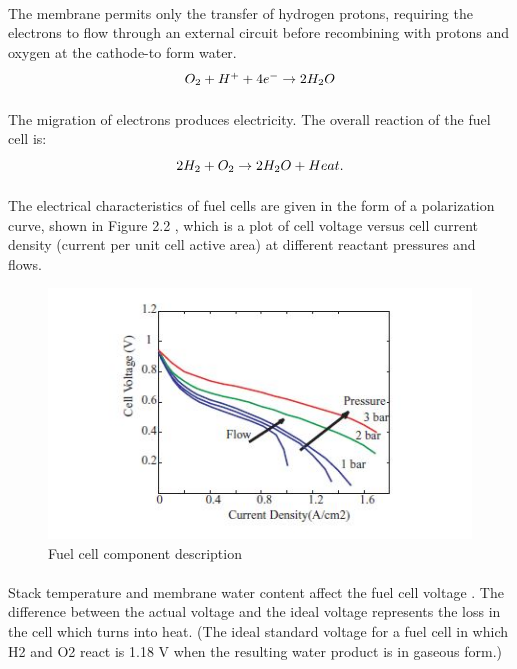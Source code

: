 \paragraph{}The membrane permits only the transfer of  hydrogen protons, requiring the electrons to flow through an external circuit before recombining with protons and oxygen at the cathode-to form water.
\begin{equation}
$$O_{2}+H^{+} + 4e^{-}\rightarrow 2H_{2}O $$
\end{equation}
\paragraph{}The migration of electrons produces electricity. The overall reaction of the fuel cell is:
\begin{equation}
$$2H_{2}+ O_{2} \rightarrow 2H_{2}O+Heat.$$
\end{equation}
\paragraph{}The electrical characteristics of fuel cells are given in the form of a polarization curve, shown in Figure 2.2 , which is a plot of cell voltage versus cell current density (current per unit cell active area) at different reactant pressures and flows.
\begin{figure}[!h]
\includegraphics{Figures/Figure6}
\caption{Fuel cell component description
\cite{stefanopoulou_mechatronics_nodate}}
\end{figure}
\paragraph{}Stack temperature and membrane water content affect the fuel cell voltage \cite{ehsani_modern_2018}. The difference between the actual voltage and the ideal voltage represents the loss in the cell which turns into heat. (The ideal standard voltage for a fuel cell in which H2 and O2 react is 1.18 V when the resulting water product is in gaseous form.)
